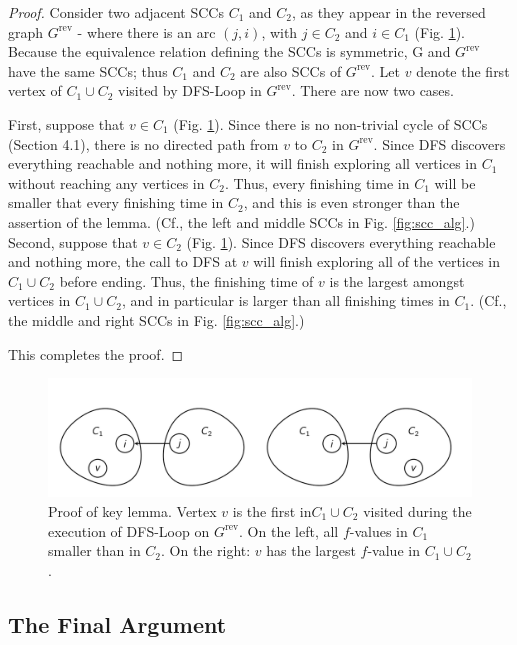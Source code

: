\documentclass [12pt]{article}
\theoremstyle{definition}
\begin{document}
\begin{proof} 
Consider two adjacent SCCs $C_1$ and $C_2$, as they appear in the reversed graph $G^{\text{rev}}$ - where there is an arc $(j, i)$, with $j \in C_2$ and $i \in C_1$ (Fig. \ref{fig:scc_proof}). Because the equivalence relation defining the SCCs is symmetric, G and $G^{\text{rev}}$ have the same SCCs; thus $C_1$ and $C_2$ are also SCCs of $G^{\text{rev}}$. Let $v$ denote the first vertex of $C_1 \cup C_2$ visited by DFS-Loop in $G^{\text{rev}}$. There are now two cases. 

First, suppose that $v \in C_1$ (Fig. \ref{fig:scc_proof}). Since there is no non-trivial cycle of SCCs (Section 4.1), there is no directed path from $v$ to $C_2$ in $G^{\text{rev}}$. Since DFS discovers everything reachable and nothing more, it will finish exploring all vertices in $C_1$ without reaching any vertices in $C_2.$ Thus, every finishing time in $C_1$ will be smaller that every finishing time in $C_2$, and this is even stronger than the assertion of the lemma. (Cf., the left and middle SCCs in Fig. \ref{fig:scc_alg}.) Second, suppose that $v \in C_2$ (Fig. \ref{fig:scc_proof}). Since DFS discovers everything reachable and nothing more, the call to DFS at $v$ will finish exploring all of the vertices in $C_1 \cup C_2$ before ending. Thus, the finishing time of $v$ is the largest amongst vertices in $C_1 \cup C_2$, and in particular is larger than all finishing times in $C_1$. (Cf., the middle and right SCCs in Fig. \ref{fig:scc_alg}.)

This completes the proof.
\end{proof}

\begin{figure}
\includegraphics[scale=0.8]{scc_proof.png}
\caption{Proof of key lemma. Vertex $v$ is the first in$ C_1 \cup C_2$ visited during the execution of DFS-Loop on $G^{\text{rev}}$. On the left, all $f$-values in $C_1$ smaller than in $C_2$. On the right: $v$ has the largest $f$-value in $C_1 \cup C_2$.}
\label{fig:scc_proof}
\end{figure}

\subsection{The Final Argument} 
\end{document}
